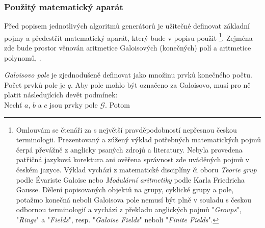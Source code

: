 
\subsubsection{Použitý matematický aparát}
Před popisem jednotlivých algoritmů generátorů je užitečné definovat základní pojmy a předestřít matematický aparát, který bude v popisu použit \footnote{Omlouvám se čtenáři za s největší pravděpodobností nepřesnou českou terminologii. Prezentovaný a zúžený výklad potřebných matematických pojmů čerpá převážně z anglicky psaných zdrojů a literatury. Nebyla provedena patřičná jazyková korektura ani ověřena správnost zde uváděných pojmů v českém jazyce. Výklad vychází z matematické disciplíny či oboru \textsl{Teorie grup} podle Évariste Galoise nebo \textsl{Modulární aritmetiky} podle Karla Friedricha Gausse. Dělení popisovaných objektů na grupy, cyklické grupy a pole, potažmo konečná neboli Galoisova pole nemusí být plně v souladu s českou odbornou terminologií a vychází z překladu anglických pojmů "\textsl{Groups}", "\textsl{Rings}" a "\textsl{Fields}", resp. "\textsl{Galoise Fields}" neboli "\textsl{Finite Fields}".}. Zejména zde bude prostor věnován aritmetice Galoisových (konečných) polí a aritmetice polynomů, \cite{holmes2007}. 


\marginpar{\textcolor{txt_blue}{Galoisovy pole}} 
\textsl{Galoisovo pole} je zjednodušeně definovat jako množinu prvků konečného počtu. Počet prvků pole je $q$. Aby pole mohlo být označeno za Galoisovo, musí pro ně platit následujících devět podmínek: 
\\ Nechť $a$, $b$ a $c$ jsou prvky pole $\mathcal{G}$. Potom 

